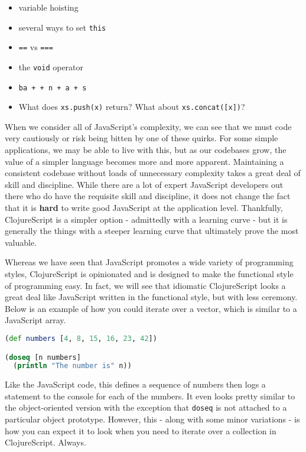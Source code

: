 \documentclass[10pt,twoside,openright]{memoir}
\begin{document}
\begin{itemize}
\tightlist
\item
  variable hoisting
\item
  several ways to set \texttt{this}
\item
  \texttt{==} vs \texttt{===}
\item
  the \texttt{void} operator
\item
  \texttt{\textquotesingle{}ba\textquotesingle{}\ +\ +\ \textquotesingle{}n\textquotesingle{}\ +\ \textquotesingle{}a\textquotesingle{}\ +\ \textquotesingle{}s\textquotesingle{}}
\item
  What does \texttt{xs.push(x)} return? What about
  \texttt{xs.concat({[}x{]})}?
\end{itemize}

When we consider all of JavaScript's complexity, we can see that we must
code very cautiously or risk being bitten by one of these quirks. For
some simple applications, we may be able to live with this, but as our
codebases grow, the value of a simpler language becomes more and more
apparent. Maintaining a consistent codebase without loads of unnecessary
complexity takes a great deal of skill and discipline. While there are a
lot of expert JavaScript developers out there who do have the requisite
skill and discipline, it does not change the fact that it is
\textbf{hard} to write good JavaScript at the application level.
Thankfully, ClojureScript is a simpler option - admittedly with a
learning curve - but it is generally the things with a steeper learning
curve that ultimately prove the most valuable.

Whereas we have seen that JavaScript promotes a wide variety of
programming styles, ClojureScript is opinionated and is designed to make
the functional style of programming easy. In fact, we will see that
idiomatic ClojureScript looks a great deal like JavaScript written in
the functional style, but with less ceremony. Below is an example of how
you could iterate over a vector, which is similar to a JavaScript array.

\begin{lstlisting}[language=Clojure, caption={Iterating over a vector in ClojureScript}]
(def numbers [4, 8, 15, 16, 23, 42])

(doseq [n numbers]
  (println "The number is" n))
\end{lstlisting}

Like the JavaScript code, this defines a sequence of numbers then logs a
statement to the console for each of the numbers. It even looks pretty
similar to the object-oriented version with the exception that
\texttt{doseq} is not attached to a particular object prototype.
However, this - along with some minor variations - is how you can expect
it to look when you need to iterate over a collection in ClojureScript.
Always.
\end{document}
